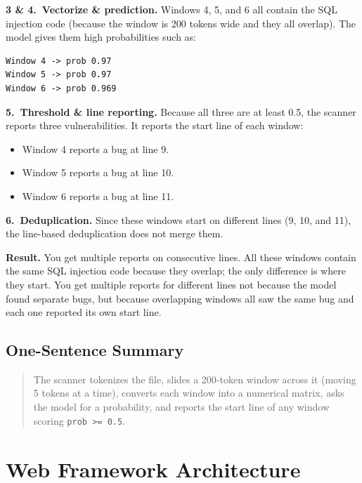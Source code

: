 \begin{enumerate}
  \textbf{3 \& 4.~Vectorize \& prediction.} Windows 4, 5, and 6 all contain the SQL injection
  code (because the window is 200 tokens wide and they all overlap). The model gives
  them high probabilities such as:

\begin{verbatim}
Window 4 -> prob 0.97
Window 5 -> prob 0.97
Window 6 -> prob 0.969
\end{verbatim}

  \textbf{5.~Threshold \& line reporting.} Because all three are at least 0.5, the scanner
  reports three vulnerabilities. It reports the start line of each window:
  \begin{itemize}
    \item Window 4 reports a bug at line 9.
    \item Window 5 reports a bug at line 10.
    \item Window 6 reports a bug at line 11.
  \end{itemize}

  \textbf{6.~Deduplication.} Since these windows start on different lines (9, 10, and 11),
  the line-based deduplication does not merge them.

  \textbf{Result.} You get multiple reports on consecutive lines. All these windows contain
  the same SQL injection code because they overlap; the only difference is where they
  start. You get multiple reports for different lines not because the model found separate
  bugs, but because overlapping windows all saw the same bug and each one reported its
  own start line.
\end{enumerate}

\subsection{One-Sentence Summary}
\label{sec:ml_summary}

\begin{quote}
The scanner tokenizes the file, slides a 200-token window across it (moving 5 tokens at a
time), converts each window into a numerical matrix, asks the model for a probability,
and reports the start line of any window scoring \texttt{prob >= 0.5}.
\end{quote}

\section{Web Framework Architecture}
\label{sec:web_framework}

